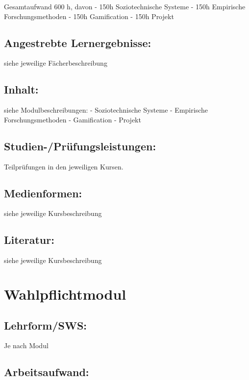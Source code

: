 Gesamtaufwand 600 h, davon - 150h Soziotechnische Systeme - 150h
Empirische Forschungsmethoden - 150h Gamification - 150h Projekt

\section{Angestrebte
Lernergebnisse:}\label{angestrebte-lernergebnisse-31}

siehe jeweilige Fächerbeschreibung

\section{Inhalt:}\label{inhalt-31}

siehe Modulbeschreibungen: - Soziotechnische Systeme - Empirische
Forschungsmethoden - Gamification - Projekt

\section{Studien-/Prüfungsleistungen:}\label{studien-pruxfcfungsleistungen-31}

Teilprüfungen in den jeweiligen Kursen.

\section{Medienformen:}\label{medienformen-31}

siehe jeweilige Kursbeschreibung

\section{Literatur:}\label{literatur-31}

siehe jeweilige Kursbeschreibung

\chapter{Wahlpflichtmodul}\label{wahlpflichtmodul}

\section{Lehrform/SWS:}\label{lehrformsws-27}

Je nach Modul

\section{Arbeitsaufwand:}\label{arbeitsaufwand-27}

